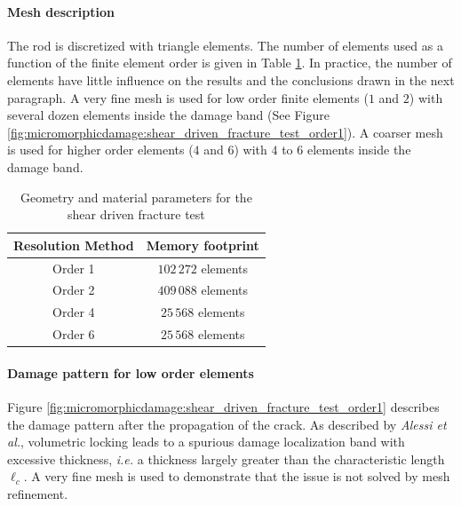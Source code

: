 \paragraph{Mesh description}
The rod is discretized with triangle elements. The number of elements
used as a function of the finite element order is given in Table
\ref{tbl:micromorphicdamage:shear_driven_fracture_test_elements}. In
practice, the number of elements have little influence on the results
and the conclusions drawn in the next paragraph.
A very fine
mesh is used for low order finite elements (\(1\) and \(2\)) with
several dozen elements inside the damage band (See Figure
\ref{fig:micromorphicdamage:shear_driven_fracture_test_order1}). A coarser
mesh is used for higher order elements (\(4\) and \(6\)) with \(4\) to
\(6\) elements inside the damage band.
%
%
%
\begin{table}[H]
  \centering
  \begin{tabular}{||c c||} 
      \hline
      Resolution Method & Memory footprint
      \\
      [0.5ex] 
      \hline\hline
      Order 1 & \(102\,272\) elements
      \\ \hline
      Order 2 & \(409\,088\) elements
      \\ \hline
      Order 4 & \(25\,568\) elements 
      \\ \hline
      Order 6 & \(25\,568\) elements 
      \\ \hline
  \end{tabular}
  \caption{Geometry and material parameters for the shear driven fracture test}
  \label{tbl:micromorphicdamage:shear_driven_fracture_test_elements}
\end{table}

\paragraph{Damage pattern for low order elements}

Figure \ref{fig:micromorphicdamage:shear_driven_fracture_test_order1}
describes the damage pattern after the propagation of the crack. As
described by \textit{Alessi et al.}, volumetric locking leads to a spurious
damage localization band with excessive thickness, \textit{i.e.} a thickness
largely greater than the characteristic length \(\ell_{c}\). A very fine
mesh is used to demonstrate that the issue is not solved by mesh
refinement.

